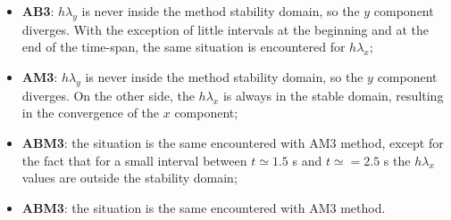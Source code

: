 \documentclass[11pt,a4paper,oneside]{article}
\begin{document}
\begin{itemize}
    \item \textbf{AB3}: $h\lambda_y$ is never inside the method stability domain, so the $y$ component diverges. With the exception of little intervals at the beginning and at the end of the time-span, the same situation is encountered for $h\lambda_x$;
    \item \textbf{AM3}: $h\lambda_y$ is never inside the method stability domain, so the $y$ component diverges. On the other side, the $h\lambda_x$ is always in the stable domain, resulting in the convergence of the $x$ component;
    \item \textbf{ABM3}: the situation is the same encountered with AM3 method, except for the fact that for a small interval between $t\simeq1.5$ s and $t\simeq=2.5$ s the $h\lambda_x$ values are outside the stability domain;
    \item \textbf{ABM3}: the situation is the same encountered with AM3 method.
\end{itemize}
\end{document}
